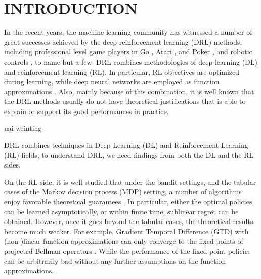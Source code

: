 \section{INTRODUCTION}
\label{sec:introduction}

In the recent years, the machine learning community has witnessed a number of great successes achieved by the deep reinforcement learning (DRL) methods, including professional level game players in Go \citep{silver2016masteringA,silver2017masteringB}, Atari \citep{mnih2015human}, and Poker \citep{moravvcik2017deepstack}, and robotic controls \citep{lillicrap2015continuous,levine2016end}, to name but a few. DRL combines methodologies of deep learning (DL) and reinforcement learning (RL). In particular, RL objectives are optimized during learning, while deep neural networks are employed as function approximations \citep{sutton2018reinforcement}. Also, mainly because of this combination, it is well known that the DRL methods usually do not have theoretical justifications that is able to explain or support its good performances in practice.

uai wrinting

DRL combines techniques in Deep Learning (DL) and Reinforcement Learning (RL) fields, to understand DRL, we need findings from both the DL and the RL sides.

On the RL side, it is well studied that under the bandit settings, and the tabular cases of the Markov decision process (MDP) setting, a number of algorithms enjoy favorable theoretical guarantees \citep{bubeck2012regret,sutton2018reinforcement}. In particular, either the optimal policies can be learned asymptotically, or within finite time, sublinear regret can be obtained. However, once it goes beyond the tabular cases, the theoretical results become much weaker. For example, Gradient Temporal Difference (GTD) with (non-)linear function approximations can only converge to the fixed points of projected Bellman operators \citep{sutton2009fast,sutton2009convergent,bhatnagar2009convergent}. While the performance of the fixed point policies can be arbitrarily bad without any further assumptions on the function approximations.

